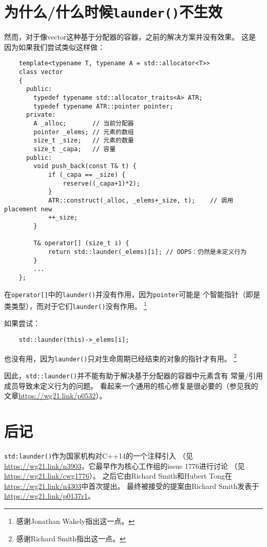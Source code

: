 \section{为什么/什么时候\texttt{launder()}不生效}
然而，对于像vector这种基于分配器的容器，之前的解决方案并没有效果。
这是因为如果我们尝试类似这样做：
\begin{lstlisting}
    template<typename T, typename A = std::allocator<T>>
    class vector
    {
      public:
        typedef typename std::allocator_traits<A> ATR;
        typedef typename ATR::pointer pointer;
      private:
        A _alloc;       // 当前分配器
        pointer _elems; // 元素的数组
        size_t _size;   // 元素的数量
        size_t _capa;   // 容量
      public:
        void push_back(const T& t) {
            if (_capa == _size) {
                reserve((_capa+1)*2);
            }
            ATR::construct(_alloc, _elems+_size, t);    // 调用placement new
            ++_size;
        }

        T& operator[] (size_t i) {
            return std::launder(_elems)[i]; // OOPS：仍然是未定义行为
        }
        ...
    };
\end{lstlisting}
在\texttt{operator[]}中的\texttt{launder()}并没有作用，因为\texttt{pointer}可能是
个智能指针（即是类类型），而对于它们\texttt{launder()}没有作用。
\footnote{感谢Jonathan Wakely指出这一点。}

如果尝试：
\begin{lstlisting}
    std::launder(this)->_elems[i];
\end{lstlisting}
也没有用，因为\texttt{launder()}只对生命周期已经结束的对象的指针才有用。
\footnote{感谢Richard Smith指出这一点。}

因此，\texttt{std::launder()}并不能有助于解决基于分配器的容器中元素含有
常量/引用成员导致未定义行为的问题。
看起来一个通用的核心修复是很必要的（参见我的文章\url{https://wg21.link/p0532}）。


\section{后记}
\texttt{std:launder()}作为国家机构对C++14的一个注释引入
（见\url{https://wg21.link/n3903}，它最早作为核心工作组的issue 1776进行讨论
（见\url{https://wg21.link/cwg1776}）。
之后它由Richard Smith和Hubert Tong在\url{https://wg21.link/n4303}中首次提出。
最终被接受的提案由Richard Smith发表于\url{https://wg21.link/p0137r1}。